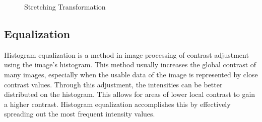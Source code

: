 \documentclass{article}
\begin{document}
	\begin{figure}[H]
	\centering
	\caption{Stretching Transformation}
	\label{fig:stretching}
	\end{figure}

	\subsection{Equalization}

	Histogram equalization is a method in image processing of contrast adjustment using the image's histogram. This method usually increases the global contrast 		of many images, especially when the usable data of the image is represented by close contrast values. Through this adjustment, the intensities can be better 		distributed on the histogram. This allows for areas of lower local contrast to gain a higher contrast. Histogram equalization accomplishes this by 		effectively spreading out the most frequent intensity values.
\end{document}
